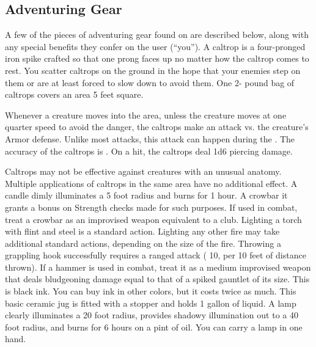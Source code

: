     \subsection{Adventuring Gear}
        A few of the pieces of adventuring gear found on  are described below, along with any special benefits they confer on the user (``you'').
         A caltrop is a four-pronged iron spike crafted so that one prong faces up no matter how the caltrop comes to rest. You scatter caltrops on the ground in the hope that your enemies step on them or are at least forced to slow down to avoid them. One 2- pound bag of caltrops covers an area 5 feet square.
        \par Whenever a creature moves into the area, unless the creature moves at one quarter speed to avoid the danger, the caltrops make an attack vs. the creature's Armor defense.
        Unlike most attacks, this attack can happen during the .
        The accuracy of the caltrops is .
        On a hit, the caltrops deal 1d6 piercing damage.
        \par Caltrops may not be effective against creatures with an unusual anatomy.
        Multiple applications of caltrops in the same area have no additional effect.
         A candle dimly illuminates a 5 foot radius and burns for 1 hour.
         A crowbar it grants a  bonus on Strength checks made for such purposes. If used in combat, treat a crowbar as an improvised weapon equivalent to a club.
         Lighting a torch with flint and steel is a standard action.
        Lighting any other fire may take additional standard actions, depending on the size of the fire.
         Throwing a grappling hook successfully requires a ranged attack ( 10,  per 10 feet of distance thrown).
         If a hammer is used in combat, treat it as a medium improvised weapon that deals bludgeoning damage equal to that of a spiked gauntlet of its size.
         This is black ink. You can buy ink in other colors, but it costs twice as much.
         This basic ceramic jug is fitted with a stopper and holds 1 gallon of liquid.
         A lamp clearly illuminates a 20 foot radius, provides shadowy illumination out to a 40 foot radius, and burns for 6 hours on a pint of oil. You can carry a lamp in one hand.
